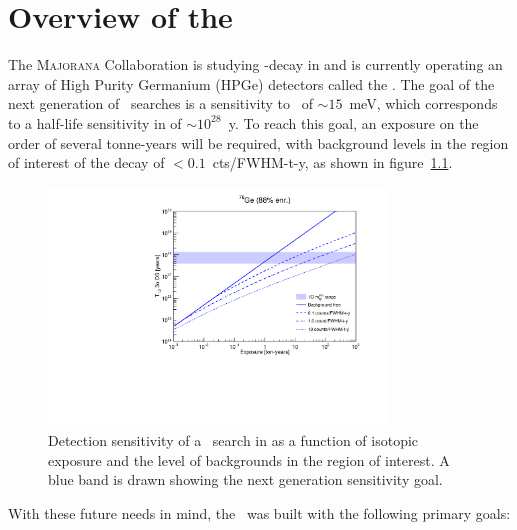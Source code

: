 \documentclass[/main.tex]{subfiles}
\begin{document}
\graphicspath{{./pics/}{ch2/pics/}}

\onlyinsubfile{\textpages}
\chapter{Overview of the \MJD}

The \textsc{Majorana} Collaboration is studying \bb -decay in  and is currently operating an array of High Purity Germanium (HPGe) detectors called the \MJD\cite{mjd2014}.
The goal of the next generation of \znbb\ searches is a sensitivity to \mbb\ of $\sim15$~meV, which corresponds to a half-life sensitivity in  of $\sim10^{28}$~y.
To reach this goal, an exposure on the order of several tonne-years will be required, with background levels in the region of interest of the decay of $<0.1$~cts/FWHM-t-y, as shown in figure~\ref{fig:sensitivity}.
\begin{figure}[h]
  \centering
  \includegraphics[width=0.8\textwidth]{sensitivityplot}
  \caption[Detection sensitivity to \znbb\ in ]{\label{fig:sensitivity}
    Detection sensitivity of a \znbb\ search in  as a function of isotopic exposure and the level of backgrounds in the region of interest. A blue band is drawn showing the next generation sensitivity goal.
  }
\end{figure}
With these future needs in mind, the \MJD\ was built with the following primary goals:
\end{document}
